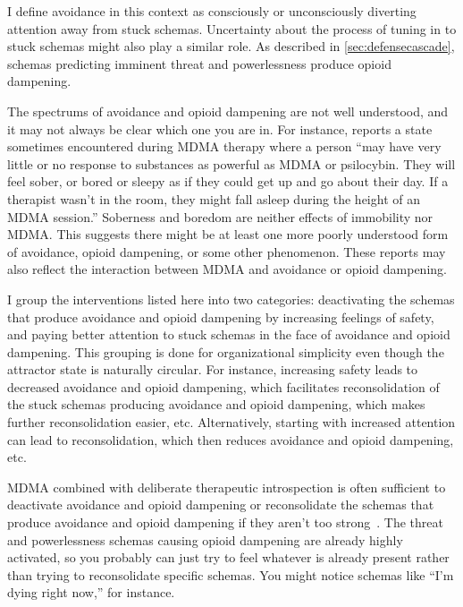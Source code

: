 \documentclass[11pt,oneside]{book}
\let\cite\parencite
\begin{document}
I define avoidance in this context as consciously or unconsciously diverting attention away from stuck schemas. Uncertainty about the process of tuning in to stuck schemas might also play a similar role. As described in \cref{sec:defensecascade}, schemas predicting imminent threat and powerlessness produce opioid dampening.

The spectrums of avoidance and opioid dampening are not well understood, and it may not always be clear which one you are in. For instance, \textcite[p. 10]{razviPSIP} reports a state sometimes encountered during MDMA therapy where a person \enquote{may have very little or no response to substances as powerful as MDMA or psilocybin. They will feel sober, or bored or sleepy as if they could get up and go about their day. If a therapist wasn't in the room, they might fall asleep during the height of an MDMA session.} Soberness and boredom are neither effects of immobility nor MDMA. This suggests there might be at least one more poorly understood form of avoidance, opioid dampening, or some other phenomenon. These reports may also reflect the interaction between MDMA and avoidance or opioid dampening.

I group the interventions listed here into two categories: deactivating the schemas that produce avoidance and opioid dampening by increasing feelings of safety, and paying better attention to stuck schemas in the face of avoidance and opioid dampening. This grouping is done for organizational simplicity even though the attractor state is naturally circular. For instance, increasing safety leads to decreased avoidance and opioid dampening, which facilitates reconsolidation of the stuck schemas producing avoidance and opioid dampening, which makes further reconsolidation easier, etc. Alternatively, starting with increased attention can lead to reconsolidation, which then reduces avoidance and opioid dampening, etc.

MDMA combined with deliberate therapeutic introspection is often sufficient to deactivate avoidance and opioid dampening or reconsolidate the schemas that produce avoidance and opioid dampening if they aren't too strong~\cite{razviPSIP}. The threat and powerlessness schemas causing opioid dampening are already highly activated, so you probably can just try to feel whatever is already present rather than trying to reconsolidate specific schemas. You might notice schemas like \enquote{I'm dying right now,} for instance.
\end{document}
